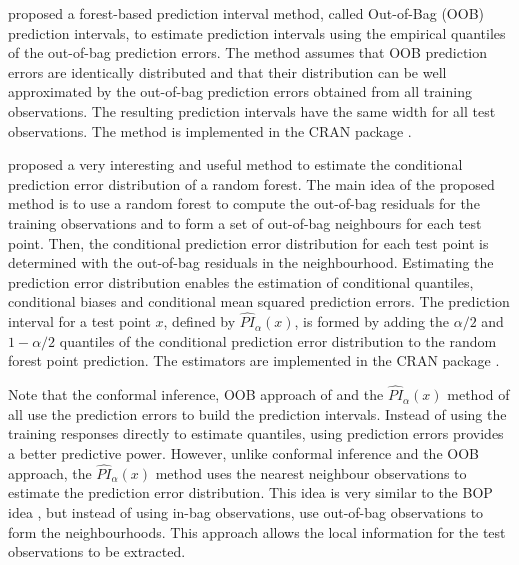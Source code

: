 \citet{zhang_random_2020} proposed a forest-based prediction interval method, called Out-of-Bag (OOB) prediction intervals, to estimate prediction intervals using the empirical quantiles of the out-of-bag prediction errors. The method assumes that OOB prediction errors are identically distributed and that their distribution can be well approximated by the out-of-bag prediction errors obtained from all training observations. The resulting prediction intervals have the same width for all test observations. The method is implemented in the CRAN package  \citep{R-rfinterval}.

\citet{lu_unified_2021} proposed a very interesting and useful method to estimate the conditional prediction error distribution of a random forest. The main idea of the proposed method is to use a random forest to compute the out-of-bag residuals for the training observations and to form a set of out-of-bag neighbours for each test point. Then, the conditional prediction error distribution for each test point is determined with the out-of-bag residuals in the neighbourhood. Estimating the prediction error distribution enables the estimation of conditional quantiles, conditional biases and conditional mean squared prediction errors. The prediction interval for a test point $x$, defined by $\widehat {PI}_{\alpha}\left(x\right)$, is formed by adding the $\alpha/2$ and $1-\alpha/2$ quantiles of the conditional prediction error distribution to the random forest point prediction. The estimators are implemented in the CRAN package  \citep{R-forestError}. 

Note that the conformal inference, OOB approach of \citet{zhang_random_2020} and the $\widehat {PI}_{\alpha}\left(x\right)$ method of \cite{lu_unified_2021} all use the prediction errors to build the prediction intervals. Instead of using the training responses directly to estimate quantiles, using prediction errors provides a better predictive power. However, unlike conformal inference and the OOB approach, the $\widehat {PI}_{\alpha}\left(x\right)$ method uses the nearest neighbour observations to estimate the prediction error distribution. This idea is very similar to the BOP idea \citep{roy_prediction_2020}, but instead of using in-bag observations, \citet{lu_unified_2021} use out-of-bag observations to form the neighbourhoods. This approach allows the local information for the test observations to be extracted. 
	
